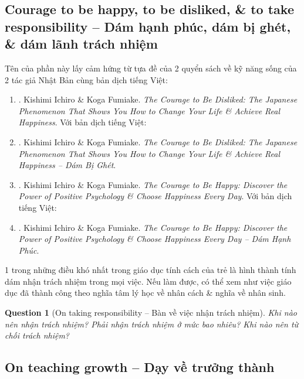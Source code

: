 \documentclass[12pt]{article}
\newtheorem{question}{Question}
\begin{document}
\subsection{Courage to be happy, to be disliked, \& to take responsibility -- Dám hạnh phúc, dám bị ghét, \& dám lãnh trách nhiệm}
Tên của phần này lấy cảm hứng từ tựa đề của 2 quyển sách về kỹ năng sống của 2 tác giả Nhật Bản cùng bản dịch tiếng Việt:
\begin{enumerate}
	\item \cite{Ichiro_Fumitake_disliked}. {\sc Kishimi Ichiro \& Koga Fumiake}. {\it The Courage to Be Disliked: The Japanese Phenomenon That Shows You How to Change Your Life \& Achieve Real Happiness}. Với bản dịch tiếng Việt:
	\item \cite{Ichiro_Fumitake_disliked_VN}. {\sc Kishimi Ichiro \& Koga Fumiake}. {\it The Courage to Be Disliked: The Japanese Phenomenon That Shows You How to Change Your Life \& Achieve Real Happiness -- Dám Bị Ghét}.
	\item \cite{Ichiro_Fumitake_happy}. {\sc Kishimi Ichiro \& Koga Fumiake}. {\it The Courage to Be Happy: Discover the Power of Positive Psychology \& Choose Happiness Every Day}. Với bản dịch tiếng Việt:
	\item \cite{Ichiro_Fumitake_happy_VN}. {\sc Kishimi Ichiro \& Koga Fumiake}. {\it The Courage to Be Happy: Discover the Power of Positive Psychology \& Choose Happiness Every Day -- Dám Hạnh Phúc}.
\end{enumerate}
1 trong những điều khó nhất trong giáo dục tính cách của trẻ là hình thành tính dám nhận trách nhiệm trong mọi việc. Nếu làm được, có thể xem như việc giáo dục đã thành công theo nghĩa tâm lý học về nhân cách \& nghĩa về nhân sinh.

\begin{question}[On taking responsibility -- Bàn về việc nhận trách nhiệm]
	Khi nào nên nhận trách nhiệm? Phải nhận trách nhiệm ở mức bao nhiêu? Khi nào nên từ chối trách nhiệm?
\end{question}

\subsection{On teaching growth -- Dạy về trưởng thành}
\end{document}
